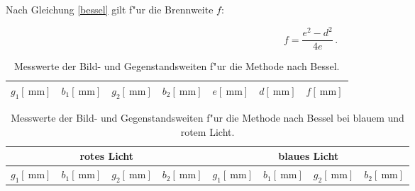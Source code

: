 


		Nach Gleichung \eqref{bessel} gilt f"ur die Brennweite $f$:

		\begin{equation}
			f = \frac{e^2 - d^2}{4e} \, .
		\end{equation}

		\begin{table}[!h]
			\begin{center}
				\label{tabelle:bessel}
				\caption{Messwerte der Bild- und Gegenstandsweiten f"ur die Methode nach Bessel.}
				\begin{tabular}{|c|c|c|c|c|c|c|}
					\hline 
					$g_1 [\SI{}{\milli \meter}]$ & $b_1 [\SI{}{\milli \meter}]$ & $g_2 [\SI{}{\milli \meter}]$ & $b_2 [\SI{}{\milli \meter}]$ & $e [\SI{}{\milli \meter}]$ & $d [\SI{}{\milli \meter}]$ & $f [\SI{}{\milli \meter}]$\\
					\hline 
					\hline
					
					\hline 
				\end{tabular}
			\end{center}
		\end{table}

		\begin{table}[!h]
			\begin{center}
				\label{tabelle:farbe}
				\caption{Messwerte der Bild- und Gegenstandsweiten f"ur die Methode nach Bessel bei blauem und rotem Licht.}
				\begin{tabular}{|c|c|c|c||c|c|c|c|}
					\hline 
					\multicolumn{4}{|c||}{rotes Licht} & \multicolumn{4}{c|}{blaues Licht} \\
					\hline
					$g_1 [\SI{}{\milli \meter}]$ & $b_1 [\SI{}{\milli \meter}]$ & $g_2 [\SI{}{\milli \meter}]$ & $b_2 [\SI{}{\milli \meter}]$ & $g_1 [\SI{}{\milli \meter}]$ & $b_1 [\SI{}{\milli \meter}]$ & $g_2 [\SI{}{\milli \meter}]$ & $b_2 [\SI{}{\milli \meter}]$ \\
					\hline 
					\hline
					
					\hline 
				\end{tabular}
			\end{center}
		\end{table}

		\clearpage

